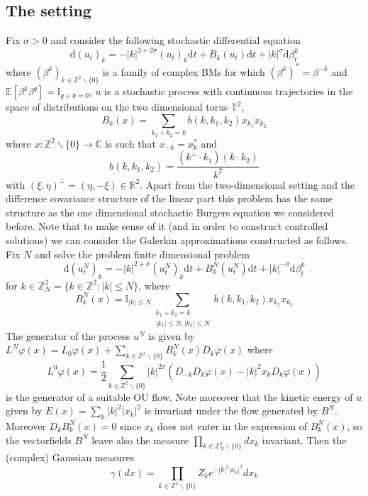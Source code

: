 \documentclass[11pt,a4paper,reqno]{amsart}
\newcommand{\TT}{\mathbb{T}}
\newcommand{\II}{\mathbb{I}}
\newcommand{\RR}{\mathbb{R}}
\newcommand{\ZZ}{\mathbb{Z}}
\newcommand{\CC}{\mathbb{C}}
\newcommand{\expect}{\mathbb{E}}
\newcommand{\dd}{\mathrm{d}}
\newcommand{\Q}{\ZZ^2\backslash\{0\}}
\newcommand{\QN}{\ZZ^2_N\backslash\{0\}}
\begin{document}
\subsection{The setting}
Fix $\sigma>0$ and consider the following stochastic differential equation
\begin{equation}
\label{eq:ns}
\dd (u_{t})_k = - |k|^{2+2\sigma} (u_{t})_k \dd t +  B_k(u_t) \dd t + |k|^{\sigma} \dd \beta^k_t
\end{equation}
where $(\beta^k)_{k\in \Q}$ is a family of complex BMs for which $(\beta^k)^* = \beta^{-k}$ and $\expect[\beta^k \beta^q] = \II_{q+k=0}$, $u$ is a stochastic process with continuous trajectories in the space of distributions on the two dimensional torus $\TT^2$,
$$
 B_k(x) = \sum_{k_1+k_2=k} b(k,k_1,k_2) x_{k_1} x_{k_2}
$$
where $x: \Q \to \CC$ is such that $x_{-k} = x_k^*$ and
$$
b(k,k_1,k_2) = \frac{(k^\bot \cdot k_1)(k \cdot k_2)}{k^2}
$$
with $(\xi,\eta)^\bot = (\eta,-\xi) \in \RR^2$. Apart from the two-dimensional setting and the difference covariance structure of the linear part this problem has the same structure as the one dimensional stochastic Burgers equation we considered before. 
Note that to make sense of it (and in order to construct controlled solutions)
we can consider the  Galerkin approximations constructed as follows. Fix $N$ and solve the  problem finite dimensional problem
\begin{equation}
\label{eq:ns-N}
\dd (u^N_{t})_k = - |k|^{2+\sigma} (u^N_{t})_k \dd t +  B^N_k(u^N_t) \dd t + |k|^{-\sigma} \dd \beta^k_t
\end{equation}
for $k \in \ZZ^2_N = \{k \in \ZZ^2 : |k| \le N\}$, where
\begin{equation}
\label{eq:drift-N}
 B^N_k(x) =\II_{|k|\le N} \sum_{\substack{k_1+k_2=k\\|k_1|\le N, |k_2|\le N}} b(k,k_1,k_2) x_{k_1} x_{k_2} 
 \end{equation}
The generator of the process $u^N$ is given by
$
L^N\varphi(x) = L_0\varphi(x) + \sum_{k\in \Q} B^N_k(x) D_k \varphi(x)
$
where
$$
L^0 \varphi(x) = \frac12  \sum_{k\in \Q} |k|^{2\sigma}( D_{-k}D_k\varphi(x) -|k|^2 x_k D_k \varphi(x))  
$$
is the generator of a suitable OU flow. Note moreover that the kinetic energy of $u$ given by
$
E(x) = \sum_k |k|^{2} |x_k|^2 
$
is invariant under the flow generated by $B^N$. Moreover
$
D_{k} B^N_k(x) = 0 
$
since $x_k$ does not enter in the expression of $B^N_k(x)$, so the vectorfields $B^N$ leave also the measure
$
\prod_{k \in \QN}  dx_k 
$
invariant. Then  the  (complex) Gaussian measures
$$
\gamma(dx) = \prod_{k \in \Q} Z_k e^{-|k|^2 |x_k|^2} dx_k
$$
\end{document}
